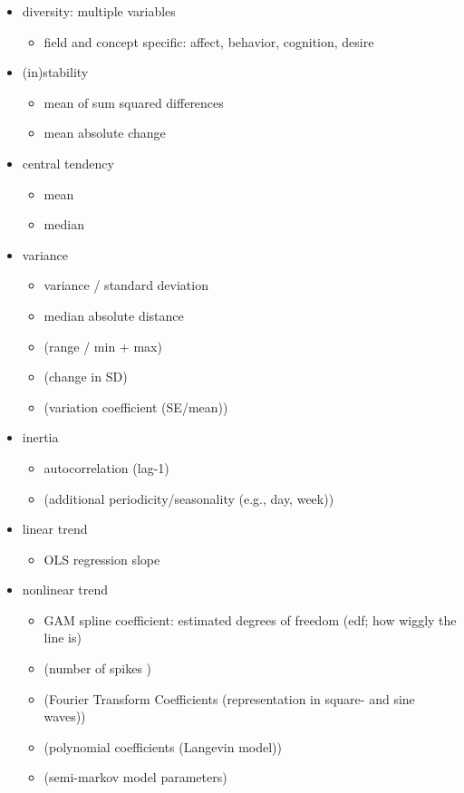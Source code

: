 \begin{itemize}
  \item diversity: multiple variables
  \begin{itemize}
    \item field and concept specific: affect, behavior, cognition, desire
  \end{itemize}
  \item (in)stability
  \begin{itemize}
    \item mean of sum squared differences
    \item mean absolute change
  \end{itemize}
  \item central tendency
  \begin{itemize}
    \item mean
    \item median
  \end{itemize}
  \item variance
  \begin{itemize}
    \item variance / standard deviation
    \item median absolute distance
    \item (range / min + max)
    \item (change in SD)
    \item (variation coefficient (SE/mean))
  \end{itemize}
  \item inertia
  \begin{itemize}
    \item autocorrelation (lag-1)
    \item (additional periodicity/seasonality (e.g., day, week))
  \end{itemize}
  \item linear trend
  \begin{itemize}
    \item OLS regression slope
  \end{itemize}
  \item nonlinear trend
  \begin{itemize}
    \item GAM spline coefficient: estimated degrees of freedom (edf; how wiggly the line is)
    \item (number of spikes \citep[e.g.,][]{caro-martin2018})
    \item (Fourier Transform Coefficients (representation in square- and sine waves))
    \item (polynomial coefficients (Langevin model))
    \item (semi-markov model parameters)
  \end{itemize}
\end{itemize}

